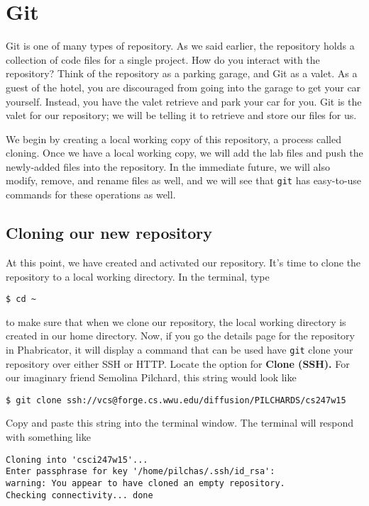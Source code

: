 \documentclass[12pt]{article}
\begin{document}
\section{Git}
Git is one of many types of repository.  As we said earlier, the repository holds a collection of code files for a single project.  How do you interact with the repository?  Think of the repository as a parking garage, and Git as a valet.  As a guest of the hotel, you are discouraged from going into the garage to get your car yourself.  Instead, you have the valet retrieve and park your car for you.  Git is the valet for our repository; we will be telling it to retrieve and store our files for us.

We begin by creating a local working copy of this repository, a process called cloning.  Once we have a local working copy, we will add the lab files and push the newly-added files into the repository.  In the immediate future, we will also modify, remove, and rename files as well, and we will see that \verb|git| has easy-to-use commands for these operations as well.

\subsection{Cloning our new repository}
At this point, we have created and activated our repository.  It's time to clone the repository to a local working directory.  In the terminal, type

\begin{verbatim}
$ cd ~
\end{verbatim}

to make sure that when we clone our repository, the local working directory is created in our home directory.  Now, if you go the details page for the repository in Phabricator, it will display a command that can be used have \verb|git| clone your repository over either SSH or HTTP.  Locate the option for \textbf{Clone (SSH).} For our imaginary friend Semolina Pilchard, this string would look like

\begin{verbatim}
$ git clone ssh://vcs@forge.cs.wwu.edu/diffusion/PILCHARDS/cs247w15
\end{verbatim}

Copy and paste this string into the terminal window.  The terminal will respond with something like

\begin{verbatim}
Cloning into 'csci247w15'...
Enter passphrase for key '/home/pilchas/.ssh/id_rsa': 
warning: You appear to have cloned an empty repository.
Checking connectivity... done
\end{verbatim}
\end{document}
